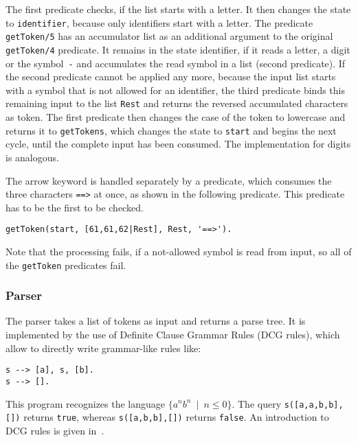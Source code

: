 The first predicate checks, if the list starts with a letter. It then changes the state to \lstinline|identifier|, because only identifiers start with a letter. The predicate \lstinline|getToken/5| has an accumulator list as an additional argument to the original \lstinline|getToken/4| predicate. It remains in the state identifier, if it reads a letter, a digit or the symbol~\lstinline|-| and accumulates the read symbol in a list (second predicate). If the second predicate cannot be applied any more, because the input list starts with a symbol that is not allowed for an identifier, the third predicate binds this remaining input to the list \lstinline|Rest| and returns the reversed accumulated characters as token. The first predicate then changes the case of the token to lowercase and returns it to \lstinline|getTokens|, which changes the state to \lstinline|start| and begins the next cycle, until the complete input has been consumed. The implementation for digits is analogous.

The arrow keyword is handled separately by a predicate, which consumes the three characters \lstinline|==>| at once, as shown in the following predicate. This predicate has to be the first to be checked.

\begin{lstlisting}
getToken(start, [61,61,62|Rest], Rest, '==>').
\end{lstlisting}

Note that the processing fails, if a not-allowed symbol is read from input, so all of the \lstinline|getToken| predicates fail.

\subsubsection{Parser}

The parser takes a list of tokens as input and returns a parse tree. It is implemented by the use of Definite Clause Grammar Rules (DCG rules), which allow to directly write grammar-like rules like:

\begin{lstlisting}
s --> [a], s, [b].
s --> [].
\end{lstlisting}

This program recognizes the language $\{ a^nb^n \enspace | \enspace n \leq 0 \}$. The query \lstinline|s([a,a,b,b],[])| returns \lstinline|true|, whereas \lstinline|s([a,b,b],[])| returns \lstinline|false|. An introduction to DCG rules is given in~\cite{ogb_dcg}.

